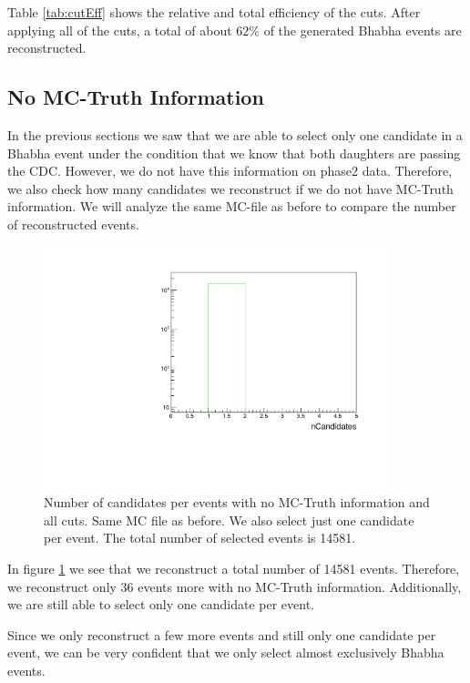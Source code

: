 \documentclass[a4paper,11pt,twosided,final,german,openbib,pdftex,listof=totoc,bibliography=totoc]{scrbook}
\begin{document}
Table \ref{tab:cutEff} shows the relative and total efficiency of the cuts. After applying all of the cuts, a total of about $62\%$ of the generated Bhabha events are reconstructed. 

\subsection{No MC-Truth Information}
\label{sec:NoMCT}

In the previous sections we saw that we are able to select only one candidate in a Bhabha event under the condition that we know that both daughters are passing the CDC. However, we do not have this information on phase2 data. Therefore, we also check how many candidates we reconstruct if we do not have MC-Truth information. We will analyze the same MC-file as before to compare the number of reconstructed events. 


\begin{figure}[h!]
	\centering
	\includegraphics[width=10cm]{Cuts/nCandNoMCInfo.pdf}
	\caption[Number Of Candidates Per Event With No MC-Truth Info (All Cuts)]{Number of candidates per events with no MC-Truth information and all cuts. Same MC file as before. We also select just one candidate per event. The total number of selected events is 14581.}
	\label{fig:nCandNoMCInfo}
\end{figure}

In figure \ref{fig:nCandNoMCInfo} we see that we reconstruct a total number of 14581 events. Therefore, we reconstruct only 36 events more with no MC-Truth information. Additionally, we are still able to select only one candidate per event. 

Since we only reconstruct a few more events and still only one candidate per event, we can be very confident that we only select almost exclusively Bhabha events.
\end{document}
